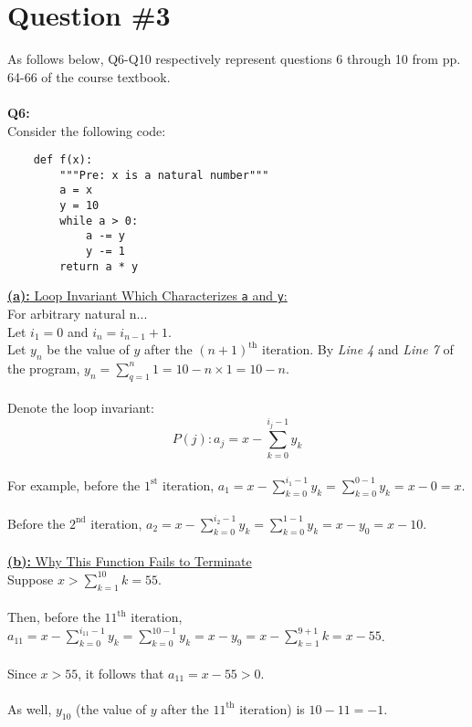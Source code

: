 \documentclass[12pt]{article}
\begin{document}
\section*{Question \#3}
As follows below, Q6-Q10 respectively represent questions 6 through 10 from pp. 64-66 of the course textbook. \\
\\
\textbf{Q6:} \\
Consider the following code:
\begin{lstlisting}
    def f(x):
        """Pre: x is a natural number"""
        a = x
        y = 10
        while a > 0:
            a -= y
            y -= 1
        return a * y
\end{lstlisting}
\underline{\textbf{(a):} Loop Invariant Which Characterizes \texttt{a} and \texttt{y}:} \\
For arbitrary natural n... \\
Let $i_1 = 0$ and $i_n = i_{n-1} + 1$. \\
Let $y_n$ be the value of $y$ after the $(n + 1)^{\text{th}}$ iteration. By \textit{Line 4} and \textit{Line 7} of the program, $y_n = \sum_{q = 1}^{n} 1 = 10 - n \times 1 = 10 - n$. \\
\\
Denote the loop invariant: \\
\[
P(j): a_j = x - \sum_{k = 0}^{i_j - 1} y_k
\]
\\
For example, before the $1^{\text{st}}$ iteration, $a_1 = x - \sum_{k = 0}^{i_1 - 1} y_k = \sum_{k = 0}^{0 - 1} y_k = x - 0 = x$. \\
\\
Before the $2^{\text{nd}}$ iteration, $a_2 = x - \sum_{k = 0}^{i_2 - 1} y_k = \sum_{k = 0}^{1 - 1} y_k = x - y_0 = x - 10$. \\
\\
\underline{\textbf{(b):} Why This Function Fails to Terminate} \\
Suppose $x > \sum_{k=1}^{10} k = 55$. \\
\\
Then, before the $11^{\text{th}}$ iteration, $a_{11} = x - \sum_{k = 0}^{i_{11} - 1} y_k = \sum_{k = 0}^{10 - 1} y_k = x - y_9 = x - \sum_{k = 1}^{9 + 1} k = x - 55$. \\
\\
Since $x > 55$, it follows that $a_{11} = x - 55 > 0$. \\
\\
As well, $y_{10}$ (the value of $y$ after the $11^{\text{th}}$ iteration) is $10 - 11 = -1$. \\
\end{document}
